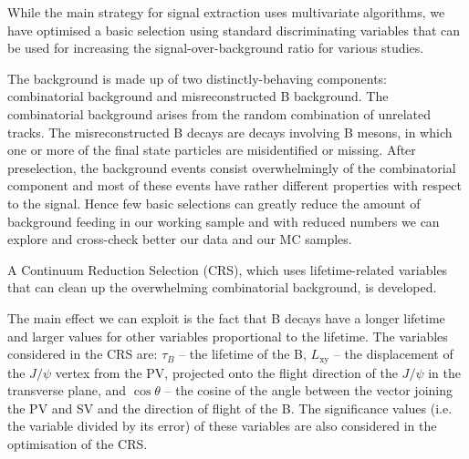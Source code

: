 While the main strategy for signal extraction uses multivariate algorithms,
we have optimised a basic selection using standard discriminating variables
that can be used for increasing the signal-over-background ratio for various studies.

The background is made up of two distinctly-behaving components: combinatorial background
and misreconstructed B background. The combinatorial background arises from the random
combination of unrelated tracks. The misreconstructed B decays are decays involving
B mesons, in which one or more of the final state particles are misidentified
or missing.
After preselection, the background events consist overwhelmingly of the combinatorial
component and most of these events have rather different properties with respect to
the signal. Hence few basic selections can greatly reduce the amount of background
feeding in our working sample and with reduced numbers we can explore and cross-check
better our data and our MC samples.

A Continuum Reduction Selection (CRS), which uses lifetime-related variables
that can clean up the overwhelming combinatorial background, is developed.

The main effect we can exploit is the fact that B decays have a longer lifetime
and larger values for other variables proportional to the lifetime.
The variables considered in the CRS are:
$\tau_{B}$ -- the lifetime of the B, $L_{\textrm{xy}}$ -- the displacement of the $J/\psi$
vertex from the PV, projected onto the flight direction of the $J/\psi$
in the transverse plane, and $\cos \theta$ -- the cosine of the angle between the vector
joining the PV and SV and the direction of flight of the B. The significance values
(i.e. the variable divided by its error) of these variables are also considered in the
optimisation of the CRS.

